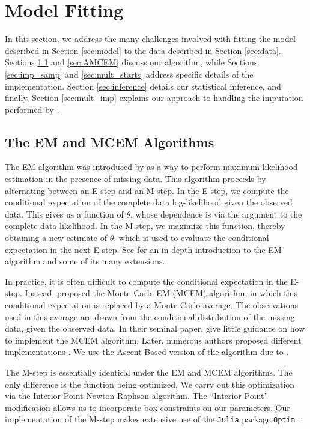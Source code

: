 \documentclass[11pt, oneside]{article}   	%
\begin{document}
\section{Model Fitting}
\label{sec:fitting}

In this section, we address the many challenges involved with fitting the model described in Section \ref{sec:model} to the data described in Section \ref{sec:data}. Sections \ref{sec:EM_MCEM} and \ref{sec:AMCEM} discuss our algorithm, while Sections \ref{sec:imp_samp} and \ref{sec:mult_starts} address specific details of the implementation. Section \ref{sec:inference} details our statistical inference, and finally, Section \ref{sec:mult_imp} explains our approach to handling the imputation performed by \citet{Sto22}.

\subsection{The EM and MCEM Algorithms}
\label{sec:EM_MCEM}

The EM algorithm was introduced by \citet{Dem77} as a way to perform maximum likelihood estimation in the presence of missing data. This algorithm proceeds by alternating between an E-step and an M-step. In the E-step, we compute the conditional expectation of the complete data log-likelihood given the observed data. This gives us a function of $\theta$, whose dependence is via the argument to the complete data likelihood. In the M-step, we maximize this function, thereby obtaining a new estimate of $\theta$, which is used to evaluate the conditional expectation in the next E-step. See \citet{McL08} for an in-depth introduction to the EM algorithm and some of its many extensions.

In practice, it is often difficult to compute the conditional expectation in the E-step. Instead, \citet{Wei90} proposed the Monte Carlo EM (MCEM) algorithm, in which this conditional expectation is replaced by a Monte Carlo average. The observations used in this average are drawn from the conditional distribution of the missing data, given the observed data. In their seminal paper, \citeauthor{Wei90} give little guidance on how to implement the MCEM algorithm. Later, numerous authors proposed different implementations \citep{Cha95,Boo99,Caf05}. We use the Ascent-Based version of the algorithm due to \citet{Caf05}.

The M-step is essentially identical under the EM and MCEM algorithms. The only difference is the function being optimized. We carry out this optimization via the Interior-Point Newton-Raphson algorithm\footnotemark \citep{Noc06}. The ``Interior-Point'' modification allows us to incorporate box-constraints on our parameters. Our implementation of the M-step makes extensive use of the \texttt{Julia} package \texttt{Optim} \citep{Mog18}.
\end{document}
